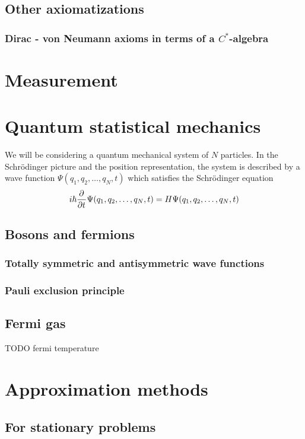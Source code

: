 \section{Other axiomatizations}
\subsection[Dirac - von Neumann axioms in terms of a C*-algebra]{Dirac - von Neumann axioms in terms of a $C^*$-algebra}

\chapter{Measurement}


\chapter{Quantum statistical mechanics}
We will be considering a quantum mechanical system of $N$ particles. In the Schrödinger picture and the position representation, the system is described by a wave function $\Psi(q_1, q_2, \ldots, q_N, t)$ which satisfies the Schrödinger equation
\[ i\hbar  \frac{\partial{^{}}}{\partial{{t}^{}}} \Psi(q_1, q_2, \ldots, q_N, t) = H \Psi(q_1, q_2, \ldots, q_N, t) \]

\section{Bosons and fermions}
\subsection{Totally symmetric and antisymmetric wave functions}
\subsection{Pauli exclusion principle}

\section{Fermi gas}
TODO fermi temperature

\chapter{Approximation methods}
\section{For stationary problems}

